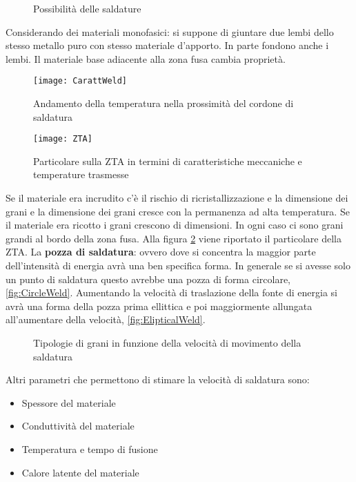 \begin{figure}
\centering
{}\quad
{}
\caption{Possibilità delle saldature}
\label{fig:Weld}
\end{figure}

Considerando dei materiali monofasici: si suppone di giuntare due lembi dello stesso metallo puro con stesso materiale d'apporto.
In parte fondono anche i lembi.
Il materiale base adiacente alla zona fusa cambia proprietà.

\begin{figure}
\centering
\texttt{[image: CarattWeld]}
\caption{Andamento della temperatura nella prossimità del cordone di saldatura}
\label{fig:CarattWeld}
\texttt{[image: ZTA]}
\caption{Particolare sulla \ac{ZTA} in termini di caratteristiche meccaniche e temperature trasmesse}
\label{fig:ZTA}
\end{figure}

Se il materiale era incrudito c'è il rischio di ricristallizzazione e la dimensione dei grani e la dimensione dei grani cresce con la permanenza ad alta temperatura.
Se il materiale era ricotto i grani crescono di dimensioni.
In ogni caso ci sono grani grandi al bordo della zona fusa.
Alla figura \ref{fig:ZTA} viene riportato il particolare della \ac{ZTA}.
La \textbf{pozza di saldatura}: ovvero dove si concentra la maggior parte dell'intensità di energia avrà una ben specifica forma.
In generale se si avesse solo un punto di saldatura questo avrebbe una pozza di forma circolare, \ref{fig:CircleWeld}.
Aumentando la velocità di traslazione della fonte di energia si avrà una forma della pozza prima ellittica e poi maggiormente allungata all'aumentare della velocità, \ref{fig:ElipticalWeld}.

\begin{figure}
\centering
{}\quad
{}
\caption{Tipologie di grani in funzione della velocità di movimento della saldatura}
\label{fig:VelWeld}
\end{figure}

Altri parametri che permettono di stimare la velocità di saldatura sono:
\begin{itemize}
\item Spessore del materiale
\item Conduttività del materiale
\item Temperatura e tempo di fusione
\item Calore latente del materiale
\end{itemize}

